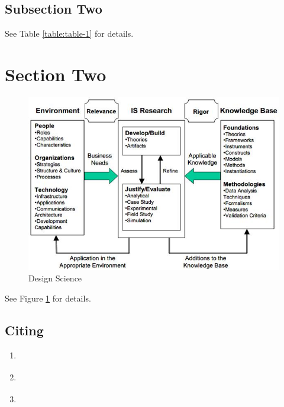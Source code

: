 \documentclass[a4paper]{article}
\begin{document}
\subsection{Subsection Two}
See Table \ref{table:table-1} for details.

\clearpage
\section{Section Two}
\begin{figure}[htbp]
\centering
\includegraphics[width=.9\linewidth]{./figures/hevner.png}
\caption{Design Science}
\label{figure:hevner}
\end{figure}
See Figure \ref{figure:hevner} for details.
\subsection{Citing}

\begin{enumerate}
\item \parencite{hevner04_desig_scien_infor_system_resear}
\item \parencite{hevner04_desig_scien_infor_system_resear}
\item \textcite{hevner04_desig_scien_infor_system_resear}
\end{enumerate}



\clearpage
\printbibliography
\end{document}
